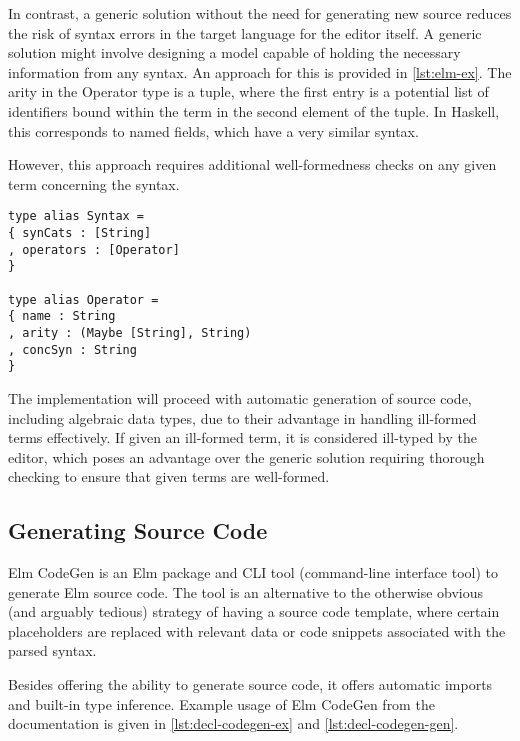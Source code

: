\documentclass[sigplan]{acmart}
\begin{document}
In contrast, a generic solution without the need for generating new source reduces the risk of syntax errors in the target language for the editor itself. A generic solution might involve designing a model capable of holding the necessary information from any syntax. An approach for this is provided in \cref{lst:elm-ex}.
The arity in the Operator type is a tuple, where the first entry is a potential
list of identifiers bound within the term in the second element of the tuple.
In Haskell, this corresponds to named fields\cite{haskell-records-named-fields},
which have a very similar syntax.

However, this approach requires additional well-formedness checks on any given term concerning the syntax.

\begin{minipage}{\linewidth}
  \begin{lstlisting}[style=inline,caption={Elm Records for storing syntax information},label={lst:elm-ex}]
type alias Syntax =
{ synCats : [String]
, operators : [Operator]
}

type alias Operator =
{ name : String
, arity : (Maybe [String], String)
, concSyn : String
}
\end{lstlisting}
\end{minipage}

The implementation will proceed with automatic generation of source code,
including algebraic data types, due to their advantage in handling ill-formed
terms effectively. If given an ill-formed term, it is considered ill-typed by
the editor, which poses an advantage over the generic solution requiring
thorough checking to ensure that given terms are well-formed.

\subsection{Generating Source Code}
Elm CodeGen\cite{elm-codegen-package} is an Elm package and
CLI tool (command-line interface tool) to generate Elm source code.
The tool is an alternative to the otherwise obvious (and arguably tedious)
strategy of having a source code template, where certain placeholders are
replaced with relevant data or code snippets associated with the parsed syntax.

Besides offering the ability to generate source code, it offers automatic
imports and built-in type inference. Example usage of Elm CodeGen from
the documentation\cite{elm-codegen-package} is given in \cref{lst:decl-codegen-ex} and \cref{lst:decl-codegen-gen}.
\end{document}
